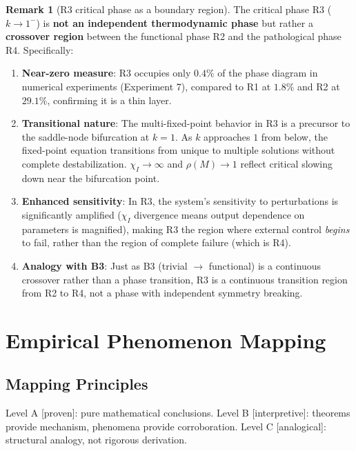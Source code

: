 \documentclass[12pt,a4paper]{article}
\theoremstyle{definition}
\newtheorem{remark}[theorem]{Remark}
\newcommand{\chiI}{\chi_I}
\begin{document}
\begin{remark}[R3 critical phase as a boundary region]
\label{rem:r3-boundary}
The critical phase R3 ($k \to 1^-$) is \textbf{not an independent thermodynamic phase} but rather a \textbf{crossover region} between the functional phase R2 and the pathological phase R4. Specifically:
\begin{enumerate}[leftmargin=*]
\item \textbf{Near-zero measure}: R3 occupies only $0.4\%$ of the phase diagram in numerical experiments (Experiment 7), compared to R1 at $1.8\%$ and R2 at $29.1\%$, confirming it is a thin layer.
\item \textbf{Transitional nature}: The multi-fixed-point behavior in R3 is a precursor to the saddle-node bifurcation at $k = 1$. As $k$ approaches $1$ from below, the fixed-point equation transitions from unique to multiple solutions without complete destabilization. $\chiI \to \infty$ and $\rho(M) \to 1$ reflect critical slowing down near the bifurcation point.
\item \textbf{Enhanced sensitivity}: In R3, the system's sensitivity to perturbations is significantly amplified ($\chiI$ divergence means output dependence on parameters is magnified), making R3 the region where external control \emph{begins} to fail, rather than the region of complete failure (which is R4).
\item \textbf{Analogy with B3}: Just as B3 (trivial $\to$ functional) is a continuous crossover rather than a phase transition, R3 is a continuous transition region from R2 to R4, not a phase with independent symmetry breaking.
\end{enumerate}
\end{remark}

\section{Empirical Phenomenon Mapping}
\label{sec:phenomena}

\subsection{Mapping Principles}

Level A [proven]: pure mathematical conclusions. Level B [interpretive]: theorems provide mechanism, phenomena provide corroboration. Level C [analogical]: structural analogy, not rigorous derivation.
\end{document}
